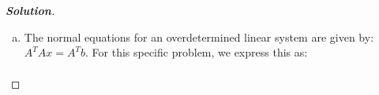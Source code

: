 \documentclass[11pt]{article}
\newenvironment{solution}{%
  \begin{proof}[\textbf{Solution}]$ $\par\nobreak\ignorespaces
}{%
  \end{proof}
}
\theoremstyle{definition}
\begin{document}
\begin{solution}
\begin{enumerate}[(a)]
\begin{align*}
    \begin{bmatrix*}0 \\ 1 \\ -1\end{bmatrix*} - \begin{bmatrix*}-2 \\ 1 \\ -1\end{bmatrix*} + \begin{bmatrix*}1 & 2 \\ -2 & 0 \\ 0 & 3\end{bmatrix*}\begin{bmatrix*}-1 \\ -1\end{bmatrix*} &= \begin{bmatrix*}1 & 2 \\ -2 & 0 \\ 0 & 3\end{bmatrix*}\tilde{x} \\
    \begin{bmatrix*} 2 \\ 0 \\ 0\end{bmatrix*} + \begin{bmatrix*}-3 \\ 2 \\-3 \end{bmatrix*} &= \begin{bmatrix*}1 & 2 \\ -2 & 0 \\ 0 & 3\end{bmatrix*}\tilde{x} \\
    \begin{bmatrix*}-1 \\ 2 \\-3 \end{bmatrix*} &= \begin{bmatrix*}1 & 2 \\ -2 & 0 \\ 0 & 3\end{bmatrix*}\tilde{x} \\
\end{align*}
\item The normal equations for an overdetermined linear system are given by: $A^TAx = A^Tb$. For this specific problem, we express this as:
\begin{align*}

\end{align*}
\end{enumerate}
\end{solution}
\end{document}
